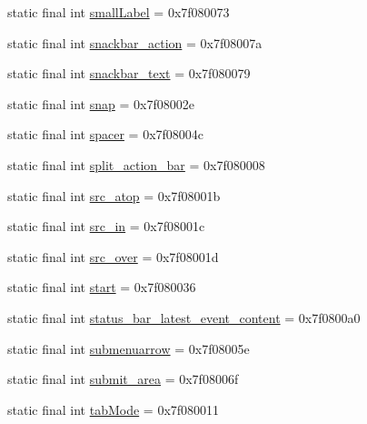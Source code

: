 \begin{CompactItemize}
static final int \hyperlink{classandroid_1_1support_1_1v7_1_1mediarouter_1_1_r_1_1id_474a98582622a8489162a76a4e5e7591}{smallLabel} = 0x7f080073
\item 
static final int \hyperlink{classandroid_1_1support_1_1v7_1_1mediarouter_1_1_r_1_1id_679a64379888be7182e7d796b3d0dc31}{snackbar\_\-action} = 0x7f08007a
\item 
static final int \hyperlink{classandroid_1_1support_1_1v7_1_1mediarouter_1_1_r_1_1id_19911a4b87c4977590f815b06f299ebd}{snackbar\_\-text} = 0x7f080079
\item 
static final int \hyperlink{classandroid_1_1support_1_1v7_1_1mediarouter_1_1_r_1_1id_0ddc60dd72cc3019522f6a15a5d34b5a}{snap} = 0x7f08002e
\item 
static final int \hyperlink{classandroid_1_1support_1_1v7_1_1mediarouter_1_1_r_1_1id_7066ca732394ea6571dcf34f740179d4}{spacer} = 0x7f08004c
\item 
static final int \hyperlink{classandroid_1_1support_1_1v7_1_1mediarouter_1_1_r_1_1id_f704ef067bc394aaac9340e8185ff8a2}{split\_\-action\_\-bar} = 0x7f080008
\item 
static final int \hyperlink{classandroid_1_1support_1_1v7_1_1mediarouter_1_1_r_1_1id_e4dc511f7ce4760a8af703a69476bcab}{src\_\-atop} = 0x7f08001b
\item 
static final int \hyperlink{classandroid_1_1support_1_1v7_1_1mediarouter_1_1_r_1_1id_454182f2383f58e4d58d1ae77655ae89}{src\_\-in} = 0x7f08001c
\item 
static final int \hyperlink{classandroid_1_1support_1_1v7_1_1mediarouter_1_1_r_1_1id_edaba975b7e850ba19b1533bc131350f}{src\_\-over} = 0x7f08001d
\item 
static final int \hyperlink{classandroid_1_1support_1_1v7_1_1mediarouter_1_1_r_1_1id_f93947943521c9c5ccc706fc40333e22}{start} = 0x7f080036
\item 
static final int \hyperlink{classandroid_1_1support_1_1v7_1_1mediarouter_1_1_r_1_1id_3e84951f3c75e58f62fa88441fc8b99e}{status\_\-bar\_\-latest\_\-event\_\-content} = 0x7f0800a0
\item 
static final int \hyperlink{classandroid_1_1support_1_1v7_1_1mediarouter_1_1_r_1_1id_b0e83e44dd625c2f9723881c06cc6cca}{submenuarrow} = 0x7f08005e
\item 
static final int \hyperlink{classandroid_1_1support_1_1v7_1_1mediarouter_1_1_r_1_1id_484c1a9b9cf20b79ced5d8610801db0d}{submit\_\-area} = 0x7f08006f
\item 
static final int \hyperlink{classandroid_1_1support_1_1v7_1_1mediarouter_1_1_r_1_1id_c2ce36fcc163126a83cf14a4e2dd7d0f}{tabMode} = 0x7f080011

\end{CompactItemize}
